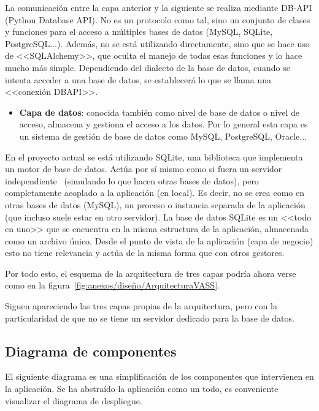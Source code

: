 La comunicación entre la capa anterior y la siguiente se realiza mediante DB-API
(Python Database API). No es un protocolo como tal, sino un conjunto de clases y
funciones para el acceso a múltiples bases de datos (MySQL, SQLite,
PostgreSQL...). Además, no se está utilizando directamente, sino que se hace uso
de <<SQLAlchemy>>, que oculta el manejo de todas esas funciones y lo hace mucho
más simple. Dependiendo del dialecto de la base de datos, cuando se intenta
acceder a una base de datos, se establecerá lo que se llama una <<conexión
DBAPI>>.

\begin{itemize}
    \item \textbf{Capa de datos}: conocida también como nivel de base de datos o
    nivel de acceso, almacena y gestiona el acceso a los datos. Por lo general
    esta capa es un sistema de gestión de base de datos como MySQL, PostgreSQL,
    Oracle...
\end{itemize}


En el proyecto actual se está utilizando SQLite, una biblioteca que implementa
un motor de base de datos. Actúa por sí mismo como si fuera un servidor
independiente~\cite{sqlite} (simulando lo que hacen otras bases de datos), pero
completamente acoplado a la aplicación (en local). Es decir, no se crea como en
otras bases de datos (MySQL), un proceso o instancia separada de la aplicación
(que incluso suele estar en otro servidor). La base de datos SQLite es un <<todo
en uno>> que se encuentra en la misma estructura de la aplicación, almacenada
como un archivo único. Desde el punto de vista de la aplicación (capa de
negocio) esto no tiene relevancia y actúa de la misma forma que con otros
gestores.

Por todo esto, el esquema de la arquitectura de tres capas podría ahora verse
como en la figura~\ref{fig:anexos/diseño/ArquitecturaVASS}.


Siguen apareciendo las tres capas propias de la arquitectura, pero con la
particularidad de que no se tiene un servidor dedicado para la base de datos.

\clearpage
\subsection{Diagrama de componentes}
El siguiente diagrama es una simplificación de los componentes que intervienen
en la aplicación. Se ha abstraído la aplicación como un todo, es conveniente
visualizar el diagrama de despliegue.

